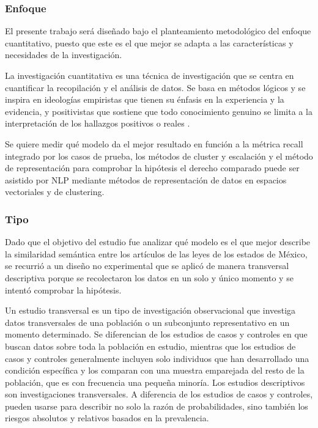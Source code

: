 \documentclass[12pt]{article}
\begin{document}
			\subsubsection{Enfoque}
			El  presente trabajo será diseñado bajo el planteamiento metodológico del enfoque cuantitativo, puesto que este es el que mejor se adapta a las características y necesidades de la investigación.
	
			La investigación cuantitativa es una técnica de investigación que se centra en cuantificar la recopilación y el análisis de datos. Se basa en métodos lógicos y se inspira en ideologías empiristas que tienen su énfasis en la experiencia y la evidencia, y positivistas que sostiene que todo conocimiento genuino se limita a la interpretación de los hallazgos positivos o reales \cite{Bryman2012}.

			Se quiere medir qué modelo da el mejor resultado en función a la métrica recall integrado por los casos de prueba, los métodos de cluster y escalación y el método de representación para comprobar la hipótesis el derecho comparado puede ser asistido por NLP mediante métodos de representación de datos en espacios vectoriales y de clustering. 
			
			
			\subsubsection{Tipo}
			Dado que el objetivo del estudio fue analizar qué modelo es el que mejor describe la similaridad semántica entre los artículos de las leyes de los estados de México, se recurrió a un diseño no experimental que se aplicó de manera transversal descriptiva porque se recolectaron los datos en un solo y único momento y se intentó comprobar la hipótesis.
			
			Un estudio transversal es un tipo de investigación observacional que investiga datos transversales de una población o un subconjunto representativo en un momento determinado. Se diferencian de los estudios de casos y controles en que buscan datos sobre toda la población en estudio, mientras que los estudios de casos y controles generalmente incluyen solo individuos que han desarrollado una condición específica y los comparan con una muestra emparejada del resto de la población, que es con frecuencia una pequeña minoría. Los estudios descriptivos son investigaciones transversales. A diferencia de los estudios de casos y controles, pueden usarse para describir no solo la razón de probabilidades, sino también los riesgos absolutos y relativos basados en la prevalencia. \cite{Wang2020}
			
\end{document}
